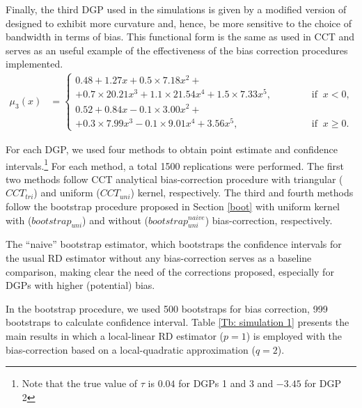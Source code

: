 \documentclass[12pt,fleqn]{article}
\begin{document}
Finally, the third DGP used in the simulations is given by a modified version of  \cite{lee2008rand} designed to exhibit more curvature and, hence, be more sensitive to the choice of bandwidth in terms of bias. This functional form is the same as used in CCT and serves as an useful example of the effectiveness of the bias correction procedures implemented.
\begin{align}
\mu_{3}(x) & =
\begin{cases}
0.48 + 1.27x + 0.5 \times 7.18x^{2}+ \\
+ 0.7 \times 20.21x^3 + 1.1 \times 21.54x^4 + 1.5 \times 7.33x^5, \;\;\;\;\;\;\;\;\;\;\;\; & \text{if} \;\; x < 0, \\
0.52 + 0.84x - 0.1 \times 3.00x^{2}+ \\
+ 0.3 \times 7.99x^3 - 0.1 \times 9.01x^4 + 3.56x^5, & \text{if} \;\; x \ge 0.
\end{cases}
\end{align}

For each DGP, we used four methods to obtain point estimate and confidence intervals.\footnote{Note that the true value of $\tau$ is $0.04$ for DGPs 1 and 3 and $-3.45$ for DGP 2} For each method, a total 1500 replications were performed. The first two methods follow CCT analytical bias-correction procedure with triangular ($CCT_{tri}$) and uniform ($CCT_{uni}$) kernel, respectively. The third and fourth methods follow the bootstrap procedure proposed in Section \ref{boot} with uniform kernel with ($bootstrap_{uni}$) and without ($bootstrap_{uni}^{naive}$) bias-correction, respectively.

The ``naive'' bootstrap estimator, which bootstraps the confidence intervals for the usual RD estimator without any bias-correction serves as a baseline comparison, making clear the need of the corrections proposed, especially for DGPs with higher (potential) bias.

In the bootstrap procedure, we used 500 bootstraps for bias correction, 999 bootstraps to calculate confidence interval. Table \ref{Tb: simulation 1} presents the main results in which a local-linear RD estimator ($p=1$) is employed with the bias-correction based on a local-quadratic approximation ($q=2$).
\end{document}
